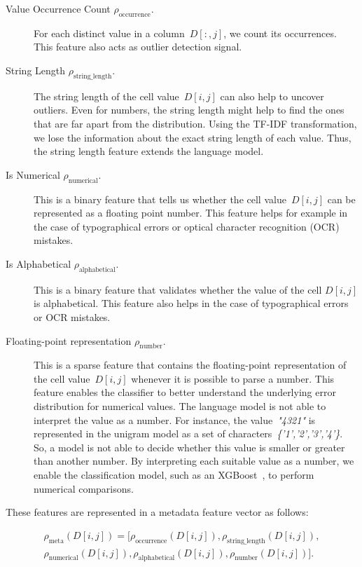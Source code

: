 \begin{description}
  \item[Value Occurrence Count $\rho_{\text{occurrence}}$.] For each distinct value in a column~$D[:,j]$, we count its occurrences. This feature also acts as outlier detection signal.
  \item[String Length $\rho_{\text{string\_length}}$.] The string length of the cell value~$D[i,j]$ can also help to uncover outliers. Even for numbers, the string length might help to find the ones that are far apart from the distribution.
  Using the TF-IDF transformation, we lose the information about the exact string length of each value. Thus, the string length feature extends the language model.
  \item[Is Numerical $\rho_{\text{numerical}}$.] This is a binary feature that tells us whether the cell value~$D[i,j]$ can be represented as a floating point number. This feature helps for example in the case of typographical errors or optical character recognition (OCR) mistakes.
  \item[Is Alphabetical $\rho_{\text{alphabetical}}$.] This is a binary feature that validates whether the value of the cell $D[i,j]$ is alphabetical. This feature also helps in the case of typographical errors or OCR mistakes.
  \item [Floating-point representation $\rho_{\text{number}}$.] This is a sparse feature that contains the floating-point representation of the cell value~$D[i,j]$ whenever it is possible to parse a number. This feature enables the classifier to better understand the underlying error distribution for numerical values. 
  The language model is not able to interpret the value as a number. For instance, the value~\emph{"4321"} is represented in the unigram model as a set of characters~\emph{\{'1','2','3','4'\}}. So, a model is not able to decide whether this value is smaller or greater than another number. By interpreting each suitable value as a number, we enable the classification model, such as an XGBoost~\cite{chen2016xgboost}, to perform numerical comparisons.
\end{description}

These features are represented in a metadata feature vector as follows:

\begin{scriptsize}
\begin{equation} \label{equation:feature_meta}
\begin{split}
\rho_{\text{meta}}(D[i,j]) = \Big[\rho_{\text{occurrence}}(D[i,j]), \rho_{\text{string\_length}}(D[i,j]), \\ \rho_{\text{numerical}}(D[i,j]), \rho_{\text{alphabetical}}(D[i,j]), \rho_{\text{number}}(D[i,j])\Big].
\end{split}
\end{equation}
\end{scriptsize}



